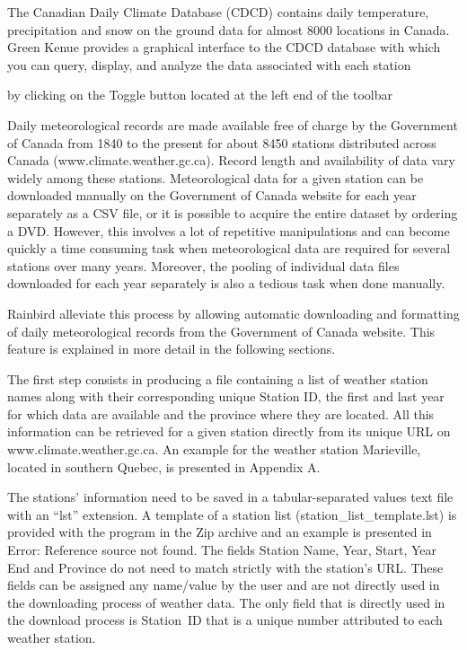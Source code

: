 \documentclass[12pt, letterpaper, fleqn]{report}
\begin{document}
The Canadian Daily Climate Database (CDCD) contains daily temperature, precipitation and snow on the ground data for almost 8000 locations in Canada. Green Kenue provides a graphical interface to the CDCD database with which you can query, display, and analyze the data associated with each station

by clicking on the Toggle button located at the left end of the toolbar

Daily meteorological records are made available free of charge by the Government of Canada from 1840 to the present for about 8450 stations distributed across Canada (www.climate.weather.gc.ca). Record length and availability of data vary widely among these stations. Meteorological data for a given station can be downloaded manually on the Government of Canada website for each year separately as a CSV file, or it is possible to acquire the entire dataset by ordering a DVD. However, this involves a lot of repetitive manipulations and can become quickly a time consuming task when meteorological data are required for several stations over many years. Moreover, the pooling of individual data files downloaded for each year separately is also a tedious task when done manually.

Rainbird alleviate this process by allowing automatic downloading and formatting of daily meteorological records from the Government of Canada website. This feature is explained in more detail in the following sections.

The first step consists in producing a file containing a list of weather station names along with their corresponding unique Station ID, the first and last year for which data are available and the province where they are located. All this information can be retrieved for a given station directly from its unique URL on www.climate.weather.gc.ca. An example for the weather station Marieville, located in southern Quebec, is presented in Appendix A.

The stations' information need to be saved in a tabular-separated values text file with an “lst” extension. A template of a station list (station\_list\_template.lst) is provided with the program in the Zip archive and an example is presented in Error: Reference source not found. The fields Station Name, Year, Start, Year End and Province do not need to match strictly with the station's URL. These fields can be assigned any name/value by the user and are not directly used in the downloading process of weather data. The only field that is directly used in the download process is Station ID that is a unique number attributed to each weather station.
\end{document}
